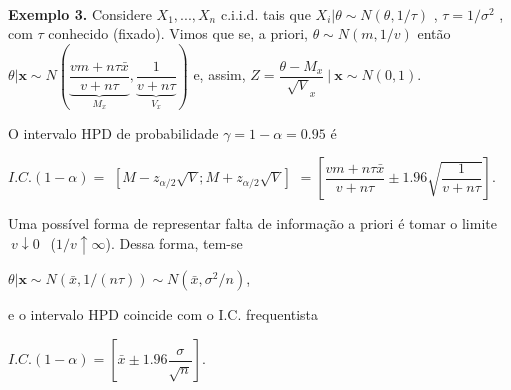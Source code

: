\documentclass[
]{book}
\begin{document}
\(~\)

\textbf{Exemplo 3.} Considere \(X_1,...,X_n\) c.i.i.d. tais que \(X_i|\theta\sim N(\theta,1/\tau)\) , \(\tau=1/\sigma^2\) , com \(\tau\) conhecido (fixado). Vimos que se, a priori, \(\theta\sim N(m,1/v)\) então \(\theta|\boldsymbol x\sim N\left(\underbrace{\dfrac{vm+n\tau\bar x}{v+n\tau}}_{M_x},\underbrace{\dfrac{1}{v+n\tau}}_{V_x}\right)\) e, assim, \(Z=\dfrac{\theta-M_x}{\sqrt V_x}~\Bigg|~\boldsymbol x\sim N(0,1)\).

O intervalo HPD de probabilidade \(\gamma=1-\alpha=0.95\) é

\(I.C.(1-\alpha)=\) \(\left[M-z_{\alpha/2}\sqrt V;M+z_{\alpha/2}\sqrt V\right]\) \(=\left[\dfrac{vm+n\tau\bar x}{v+n\tau}\pm1.96\sqrt{\dfrac{1}{v+n\tau}}\right]\).

Uma possível forma de representar falta de informação a priori é tomar o limite \(~v\downarrow 0~~\) (\(1/v\uparrow \infty\)). Dessa forma, tem-se

\(\theta|\boldsymbol x\sim N(\bar x,1/(n\tau))\sim N(\bar x,\sigma^2/n)\),

e o intervalo HPD coincide com o I.C. frequentista

\(I.C.(1-\alpha)=\left[\bar x\pm 1.96\dfrac{\sigma}{\sqrt{n}}\right]\).
\end{document}
